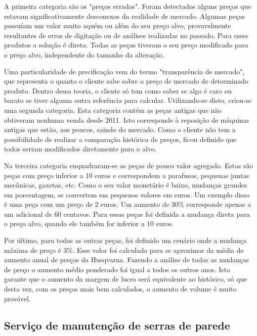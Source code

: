 \documentclass[12pt]{article}
\begin{document}
	A primeira categoria são os "preços errados". Foram detectados alguns preços que estavam significativamente desconexos da realidade de mercado. Algumas peças possuíam um valor muito aquém ou além do seu preço alvo, provavelmente resultantes de erros de digitação ou de análises realizadas no passado. Para esses produtos a solução é direta. Todas as peças tiveram o seu preço modificado para o preço alvo, independente do tamanho da alteração.

	Uma particularidade de precificação vem do termo "transparência de mercado", que representa o quanto o cliente sabe sobre o preço de mercado de determinado produto. Dentro dessa teoria, o cliente só tem como saber se algo é caro ou barato se tiver alguma outra referência para calcular. Utilizando-se disto, criou-se uma segunda categoria. Esta categoria contém as peças antigas que não obtiveram nenhuma venda desde 2011. Isto corresponde à reposição de máquinas antigas que estão, aos poucos, saindo do mercado. Como o cliente não tem a possibilidade de realizar a comparação histórica de preços, ficou definido que todos seriam modificados diretamente para o alvo.

	Na terceira categoria enquadraram-se as peças de pouco valor agregado. Estas são peças com preço inferior a 10 euros e correspondem a parafusos, pequenas juntas mecânicas, gaxetas, etc. Como o seu valor monetário é baixo, mudanças grandes em porcentagem, se convertem em pequenos valores em euros. Um exemplo disso é uma peça com um preço de 2 euros. Um aumento de 30\% corresponde apenas a um adicional de 60 centavos. Para essas peças foi definida a mudança direta para o preço alvo, quando ele também for inferior a 10 euros.

	Por último, para todas as outras peças, foi definido um cenário onde a mudança máxima de preço é 3\%. Esse valor foi calculado para se aproximar da média de aumento anual de preços da Husqvarna. Fazendo a análise de todas as mudanças de preço o aumento médio ponderado foi igual a todos os outros anos. Isto garante que o aumento da margem de lucro será equivalente ao histórico, só que desta vez, com os preços mais bem calculados, o aumento de volume é muito provável.

\subsection{Serviço de manutenção de serras de parede}
\end{document}
